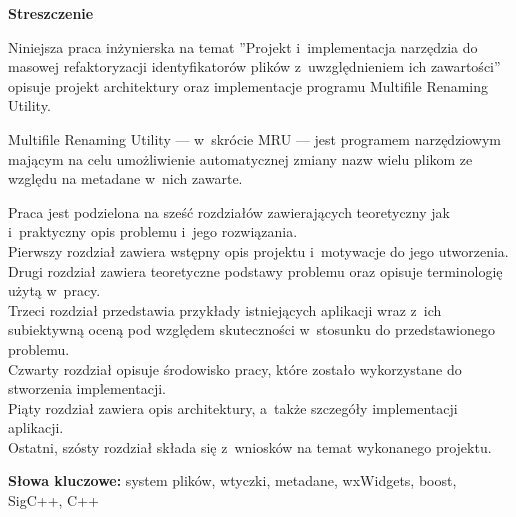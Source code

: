 \clearpage

\begin{center}
\textbf{Streszczenie}
\end{center}

\par
Niniejsza praca inżynierska na temat ''Projekt i~implementacja narzędzia do masowej refaktoryzacji identyfikatorów plików z~uwzględnieniem ich zawartości'' opisuje projekt architektury oraz implementacje programu Multifile Renaming Utility.
\par
Multifile Renaming Utility --- w~skrócie MRU --- jest programem narzędziowym mającym na celu umożliwienie automatycznej zmiany nazw wielu plikom ze względu na metadane w~nich zawarte.

\par
Praca jest podzielona na sześć rozdziałów zawierających teoretyczny jak i~praktyczny opis problemu i~jego rozwiązania.\\
Pierwszy rozdział zawiera wstępny opis projektu i~motywacje do jego utworzenia.\\
Drugi rozdział zawiera teoretyczne podstawy problemu oraz opisuje terminologię użytą w~pracy.\\
Trzeci rozdział przedstawia przykłady istniejących aplikacji wraz z~ich subiektywną oceną pod względem skuteczności w~stosunku do przedstawionego problemu.\\
Czwarty rozdział opisuje środowisko pracy, które zostało wykorzystane do stworzenia implementacji.\\
Piąty rozdział zawiera opis architektury, a~także szczegóły implementacji aplikacji.\\
Ostatni, szósty rozdział składa się z~wniosków na temat wykonanego projektu.

\vspace*{\baselineskip}

\noindent\textbf{Słowa kluczowe:} system plików, wtyczki, metadane, wxWidgets, boost, SigC++, C++
